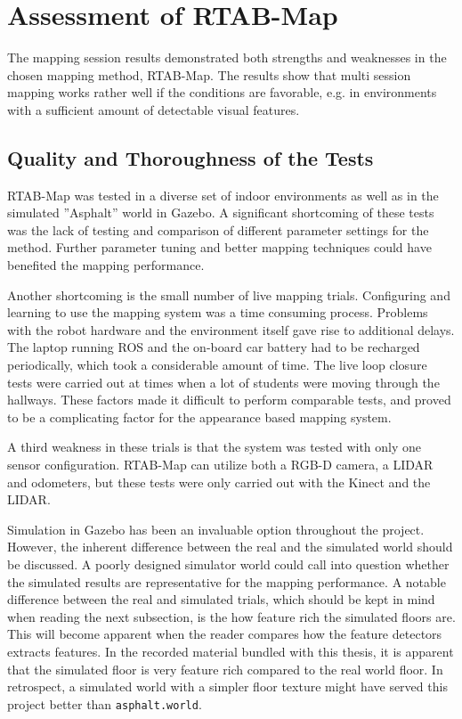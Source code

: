 \section{Assessment of RTAB-Map}

The mapping session results demonstrated both strengths and weaknesses  in the chosen mapping method, \ac{RTAB-Map}. The results show that multi session mapping works rather well if the conditions are favorable, e.g. in environments with a sufficient amount of detectable visual features. 

\subsection{Quality and Thoroughness of the Tests}

\ac{RTAB-Map} was tested in a diverse set of indoor environments as well as in the simulated ''Asphalt'' world in Gazebo. A significant shortcoming of these tests was the lack of testing and comparison of different parameter settings for the method. Further parameter tuning and better mapping techniques could have benefited the mapping performance.

Another shortcoming is the small number of live mapping trials. Configuring and learning to use the mapping system was a time consuming process. Problems with the robot hardware and the environment itself gave rise to additional delays. The laptop running \ac{ROS} and the on-board car battery had to be recharged periodically, which took a considerable amount of time. The live loop closure tests were carried out at times when a lot of students were moving through the hallways. These factors made it difficult to perform comparable tests, and proved to be a complicating factor for the appearance based mapping system. 

A third weakness in these trials is that the system was tested with only one sensor configuration. \ac{RTAB-Map} can utilize both a RGB-D camera, a LIDAR and odometers, but these tests were only carried out with the Kinect and the LIDAR.

Simulation in Gazebo has been an invaluable option throughout the project. However, the inherent difference between the real and the simulated world should be discussed. A poorly designed simulator world could call into question whether the simulated results are representative for the mapping performance. A notable difference between the real and simulated trials, which should be kept in mind when reading the next subsection, is the how feature rich the simulated floors are. This will become apparent when the reader compares how the feature detectors extracts features. In the recorded material bundled with this thesis, it is apparent that the simulated floor is very feature rich compared to the real world floor. In retrospect, a simulated world with a simpler floor texture might have served this project better than \texttt{asphalt.world}. 

